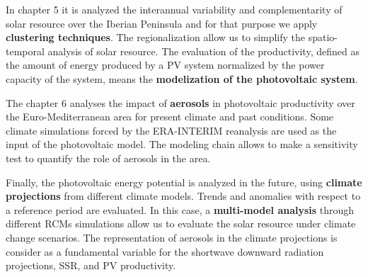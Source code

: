   In chapter 5 it is analyzed the interannual variability and complementarity of solar resource over the Iberian Peninsula and for that purpose we apply \textbf{clustering techniques}. The regionalization allow us to simplify the spatio-temporal analysis of solar resource. The evaluation of the productivity, defined as the amount of energy produced by a PV system normalized by the power capacity of the system, means the \textbf{modelization of the photovoltaic system}.
  
  The chapter 6 analyses the impact of \textbf{aerosols} in photovoltaic productivity over the Euro-Mediterranean area for present climate and past conditions.  Some climate simulations forced by the ERA-INTERIM reanalysis are used as the input of the photovoltaic model. The modeling chain allows to make a sensitivity test to quantify the role of aerosols in the area.

  
  Finally, the photovoltaic energy potential is analyzed in the future, using \textbf{climate projections} from different climate models. Trends and anomalies with respect to a reference period are evaluated. In this case, a \textbf{multi-model analysis} through different RCMs simulations allow us to evaluate the solar resource under climate change scenarios. The representation of aerosols in the climate projections is consider as a fundamental variable for the shortwave downward radiation projections, SSR, and PV productivity.

  

